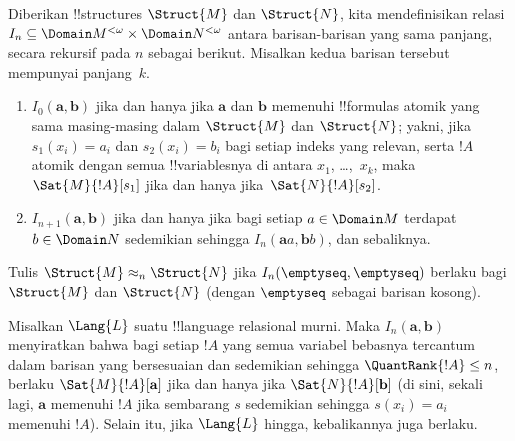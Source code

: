 \documentclass[../../../include/open-logic-section]{subfiles}
\begin{document}
\begin{defn}
  Diberikan !!{structure}s $\Struct{M}$ dan $\Struct{N}$, kita mendefinisikan
  relasi $I_n \subseteq \Domain M^{<\omega} \times \Domain N^{<\omega}$
  antara barisan-barisan yang sama panjang, secara rekursif pada $n$ sebagai
  berikut. Misalkan kedua barisan tersebut mempunyai panjang~$k$.
   \begin{enumerate}
   \item $I_0(\mathbf{a},\mathbf{b})$ jika dan hanya jika $\mathbf{a}$ dan
     $\mathbf{b}$ memenuhi !!{formula}s atomik yang sama masing-masing dalam
     $\Struct{M}$ dan $\Struct{N}$; yakni, jika $s_1(x_i) = a_i$ dan
     $s_2(x_i) = b_i$ bagi setiap indeks yang relevan, serta $!A$ atomik dengan semua
     !!{variable}snya di antara $x_1$, \dots,~$x_k$, maka
     $\Sat{M}{!A}[s_1]$ jika dan hanya jika~$\Sat{N}{!A}[s_2]$.
   \item $I_{n+1} (\mathbf{a},\mathbf{b})$ jika dan hanya jika bagi setiap
     $a\in \Domain M$ terdapat $b\in \Domain N$ sedemikian sehingga $I_n
     (\mathbf{a}a,\mathbf{b}b)$, dan sebaliknya.
   \end{enumerate}
\end{defn}

\begin{defn}
  Tulis $\Struct{M} \approx_n \Struct{N}$ jika
  $I_n(\emptyseq,\emptyseq)$ berlaku bagi $\Struct{M}$ dan $\Struct{N}$
  (dengan $\emptyseq$ sebagai barisan kosong).
\end{defn}

\begin{thm}
  Misalkan $\Lang{L}$ suatu !!{language} relasional murni. Maka
  $I_n(\mathbf{a},\mathbf{b})$ menyiratkan bahwa bagi setiap $!A$ yang semua
  variabel bebasnya tercantum dalam barisan yang bersesuaian dan sedemikian
  sehingga $\QuantRank{!A} \le n$, berlaku $\Sat{M}{!A}[\mathbf{a}]$ jika
  dan hanya jika $\Sat{N}{!A}[\mathbf{b}]$ (di sini, sekali lagi,
  $\mathbf{a}$ memenuhi $!A$ jika sembarang $s$ sedemikian sehingga
  $s(x_i) = a_i$ memenuhi $!A$). Selain itu, jika $\Lang{L}$ hingga,
  kebalikannya juga berlaku.
\end{thm}
\end{document}
